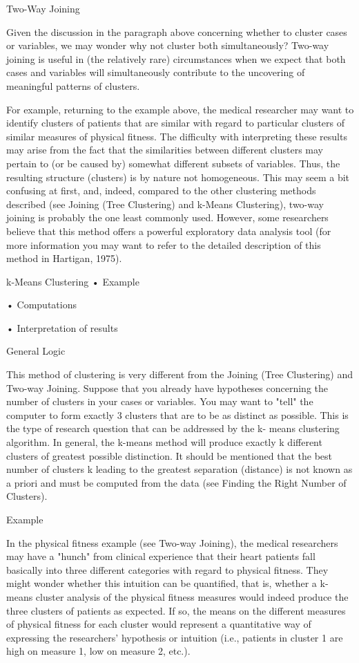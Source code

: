 Two-Way Joining


Given the discussion in the paragraph above concerning whether to cluster cases or variables, we may wonder why not cluster both simultaneously? Two-way joining is useful in (the relatively rare) circumstances when we expect that both cases and variables will simultaneously contribute to the uncovering of meaningful patterns of clusters.



For example, returning to the example above, the medical researcher may want to identify clusters of patients that are similar with regard to particular clusters of similar measures of physical fitness. The difficulty with interpreting these results may arise from the fact that the similarities between different clusters may pertain to (or be caused by) somewhat different subsets of variables. Thus, the resulting structure (clusters) is by nature not homogeneous. This may seem a bit confusing at first, and, indeed, compared to the other clustering methods described (see Joining (Tree Clustering) and k-Means Clustering), two-way joining is probably the one least commonly used. However, some researchers believe that this method offers a powerful exploratory data analysis tool (for more information you may want to refer to the detailed description of this method in Hartigan, 1975).

k-Means Clustering
•
Example

•
Computations

•
Interpretation of results


General Logic

This method of clustering is very different from the Joining (Tree Clustering) and Two-way Joining. Suppose that you already have hypotheses concerning the number of clusters in your cases or variables. You may want to "tell" the computer to form exactly 3 clusters that are to be as distinct as possible. This is the type of research question that can be addressed by the k- means clustering algorithm. In general, the k-means method will produce exactly k different clusters of greatest possible distinction. It should be mentioned that the best number of clusters k leading to the greatest separation (distance) is not known as a priori and must be computed from the data (see Finding the Right Number of Clusters).

Example

In the physical fitness example (see Two-way Joining), the medical researchers may have a "hunch" from clinical experience that their heart patients fall basically into three different categories with regard to physical fitness. They might wonder whether this intuition can be quantified, that is, whether a k-means cluster analysis of the physical fitness measures would indeed produce the three clusters of patients as expected. If so, the means on the different measures of physical fitness for each cluster would represent a quantitative way of expressing the researchers' hypothesis or intuition (i.e., patients in cluster 1 are high on measure 1, low on measure 2, etc.).

